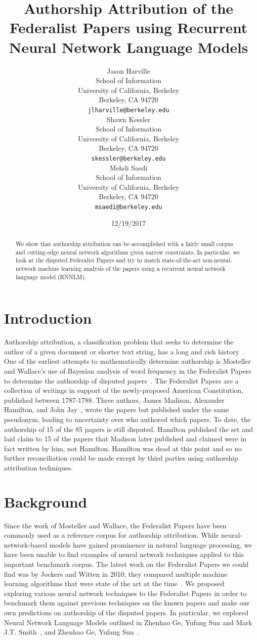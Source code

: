 \documentclass[11pt]{article}
\title{Authorship Attribution of the Federalist Papers using Recurrent Neural Network Language Models}
\author{Jason Harville \\
  \small School of Information \\
  \small University of California, Berkeley\\
  \small Berkeley, CA 94720 \\
  {\tt \small jlharville@berkeley.edu} \\\And
  Shawn Kessler \\
  \small School of Information \\
  \small University of California, Berkeley\\
  \small Berkeley, CA 94720 \\
  {\tt \small skessler@berkeley.edu} \\\And
  Mehdi Saedi \\
  \small School of Information \\
  \small University of California, Berkeley\\
  \small Berkeley, CA 94720 \\
  {\tt \small msaedi@berkeley.edu} \\}
\date{12/19/2017}
\begin{document}
\maketitle
\begin{abstract}
  We show that authorship attribution can be accomplished with a fairly small corpus and cutting-edge neural network algorithms given narrow constraints. In particular, we look at the disputed Federalist Papers and try to match state-of-the-art non-neural-network machine learning analysis of the papers using a recurrent neural network language model (RNNLM).
\end{abstract}

\section{Introduction}

Authorship attribution, a classification problem that seeks to determine the author of a given document or shorter text string, has a long and rich history~\cite{Stamatatos:08}. One of the earliest attempts to mathematically determine authorship is Mosteller and Wallace’s use of Bayesian analysis of word frequency in the Federalist Papers to determine the authorship of disputed papers~\cite{Mosteller:63}. The Federalist Papers are a collection of writings in support of the newly-proposed American Constitution, published between 1787-1788. Three authors, James Madison, Alexander Hamilton, and John Jay~, wrote the papers but published under the same pseudonym, leading to uncertainty over who authored which papers. To date, the authorship of 15 of the 85 papers is still disputed. Hamilton published the set and laid claim to 15 of the papers that Madison later published and claimed were in fact written by him, not Hamilton. Hamilton was dead at this point and so no further reconciliation could be made except by third parties using authorship attribution techniques.

\section{Background}
Since the work of Mosteller and Wallace, the Federalist Papers have been commonly used as a reference corpus for authorship attribution. While neural-network-based models have gained prominence in natural language processing, we have been unable to find examples of neural network techniques applied to this important benchmark corpus. The latest work on the Federalist Papers we could find was by Jockers and Witten in 2010; they compared multiple machine learning algorithms that were state of the art at the time~\cite{Jockers:10}. We proposed exploring various neural network techniques to the Federalist Papers in order to benchmark them against previous techniques on the known papers and make our own predictions on authorship of the disputed papers. In particular, we explored Neural Network Language Models outlined in Zhenhao Ge, Yufang Sun and Mark J.T. Smith~, and Zhenhao Ge, Yufang Sun~.
\end{document}
